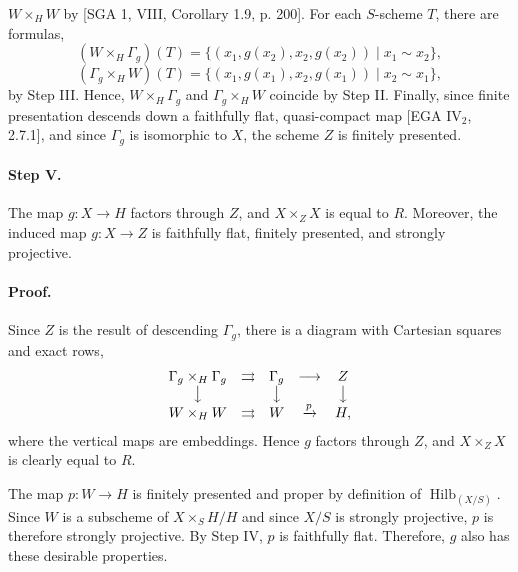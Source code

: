 

\DeclareMathOperator{\Hilb}{Hilb}


$W\times_H W$ by [SGA 1, VIII, Corollary 1.9, p. 200]. For each $S$-scheme
$T$, there are formulas,
\[
(W\times_H\Gamma_g)(T)
=\{(x_1,g(x_2),x_2,g(x_2))\mid x_1\sim x_2\},
\]
\[
(\Gamma_g\times_H W)(T)
=\{(x_1,g(x_1),x_2,g(x_1))\mid x_2\sim x_1\},
\]
by Step III. Hence, $W\times_H\Gamma_g$ and $\Gamma_g\times_H W$ coincide
by Step II. Finally, since finite presentation descends down a faithfully
flat, quasi-compact map [EGA $\mathrm{IV}_2$, 2.7.1], and since $\Gamma_g$
is isomorphic to $X$, the scheme $Z$ is finitely presented.

\paragraph{Step V.}
The map $g:X\to H$ factors through $Z$, and $X\times_Z X$ is equal to $R$.
Moreover, the induced map $g:X\to Z$ is faithfully flat, finitely
presented, and strongly projective.

\paragraph{Proof.}
Since $Z$ is the result of descending $\Gamma_g$, there is a diagram with
Cartesian squares and exact rows,
\[
\begin{array}{ccccc}
\Gamma_g\times_H\Gamma_g&\rightrightarrows&\Gamma_g&\longrightarrow&Z
\\
\big\downarrow&&\big\downarrow&&\big\downarrow
\\
W\times_H W&\rightrightarrows&W&\xrightarrow{p}&H,
\end{array}
\]
where the vertical maps are embeddings. Hence $g$ factors through $Z$, and
$X\times_Z X$ is clearly equal to $R$.

The map $p:W\to H$ is finitely presented and proper by definition of
$\Hilb_{(X/S)}$. Since $W$ is a subscheme of $X\times_S H/H$ and since
$X/S$ is strongly projective, $p$ is therefore strongly projective. By
Step IV, $p$ is faithfully flat. Therefore, $g$ also has these desirable
properties.

